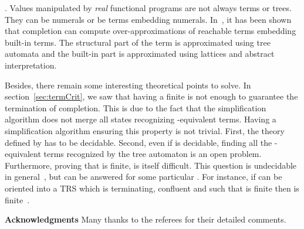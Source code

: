 \documentclass[a4paper,11pt]{llncs}
\theoremstyle{plain}
\begin{document}
\medskip
{}. Values manipulated by {\em real} functional
programs are not always terms or trees. They can be numerals or be terms
embedding numerals. In~\cite{GenetGLM-CIAA13}, it has been shown that completion
can compute over-approximations of reachable terms embedding built-in
terms. The structural part of the term is approximated using tree automata
and the built-in part is approximated using lattices and abstract
interpretation.



\medskip
\noindent
Besides, there remain some interesting theoretical points to solve. In
section~\ref{sec:termCrit}, we saw that having a finite  is not enough to guarantee the termination of
completion. This is due to the fact that the simplification algorithm does not
merge all states recognizing -equivalent terms. Having a simplification
algorithm ensuring this property is not trivial. First,  the theory defined 
by  has to be decidable. Second, even if  is decidable, finding all the 
-equivalent terms recognized by the tree automaton is an open problem.
Furthermore, proving that  is finite, is itself difficult. This
question is undecidable in general~\cite{TisonPrivate}, but can be answered for
some particular . For instance, if  can be oriented into
a TRS  which is terminating, confluent and such that  is finite
then  is finite~\cite{TisonPrivate}.

\medskip
\noindent
{\bf Acknowledgments} Many thanks to the referees for their detailed comments.



{\small }
\end{document}
